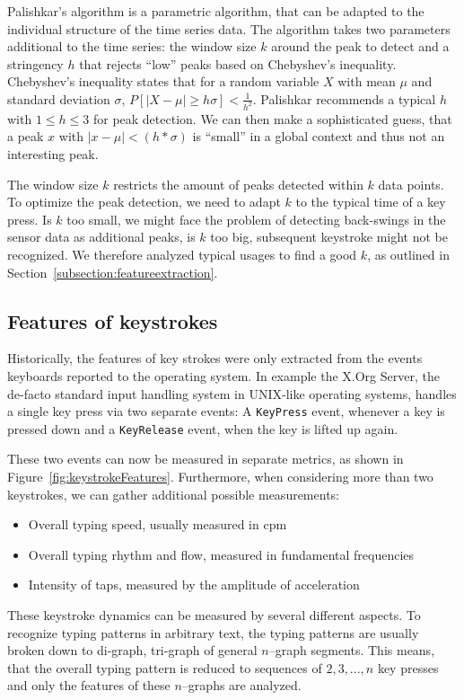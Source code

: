 Palishkar's algorithm is a parametric algorithm, that can be adapted to the individual structure of the time series data. The algorithm takes two parameters additional to the time series: the window size $k$ around the peak to detect and a stringency $h$ that rejects ``low'' peaks based on Chebyshev's inequality. Chebyshev's inequality states that for a random variable $X$ with mean $\mu$ and standard deviation $\sigma$, $P[|X - \mu| \geq h\sigma] < \frac{1}{h^2}$. Palishkar recommends a typical $h$ with $1 \leq h \leq 3$ for peak detection. We can then make a sophisticated guess, that a peak $x$ with $|x - \mu| < (h * \sigma)$ is ``small'' in a global context and thus not an interesting peak.

The window size $k$ restricts the amount of peaks detected within $k$ data points. To optimize the peak detection, we need to adapt $k$ to the typical time of a key press. Is $k$ too small, we might face the problem of detecting back-swings in the sensor data as additional peaks, is $k$ too big, subsequent keystroke might not be recognized. We therefore analyzed typical usages to find a good $k$, as outlined in Section~\ref{subsection:featureextraction}.

\subsection{Features of keystrokes}
Historically, the features of key strokes were only extracted from the events keyboards reported to the operating system. In example the X.Org Server, the de-facto standard input handling system in UNIX-like operating systems, handles a single key press via two separate events: A \lstinline$KeyPress$ event, whenever a key is pressed down and a \lstinline$KeyRelease$ event, when the key is lifted up again.

These two events can now be measured in separate metrics, as shown in Figure~\ref{fig:keystrokeFeatures}. Furthermore, when considering more than two keystrokes, we can gather additional possible measurements:
\begin{itemize}
    \item Overall typing speed, usually measured in \gls{cpm}
    \item Overall typing rhythm and flow, measured in fundamental frequencies
    \item Intensity of taps, measured by the amplitude of acceleration
\end{itemize}

These keystroke dynamics can be measured by several different aspects. To recognize typing patterns in arbitrary text, the typing patterns are usually broken down to di-graph, tri-graph of general $n$--graph segments. This means, that the overall typing pattern is reduced to sequences of $2, 3, ..., n$ key presses and only the features of these $n$--graphs are analyzed.

